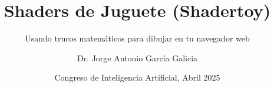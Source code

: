 \documentclass[aspectratio=169,11pt]{beamer}
\title[Shadertoy]{Shaders de Juguete (Shadertoy)}
\subtitle{Usando trucos matemáticos para dibujar en tu navegador web}
\author[Dr. Jorge García]{Dr. Jorge Antonio García Galicia}
\institute[FES Acatlán]{
    \normalsize{\email{nemediano.github.io}}
}
\date[Congreso AI 2025] %
{Congreso de Inteligencia Artificial, Abril 2025}
\begin{document}
\begin{frame}{}
    \maketitle
\end{frame}







\begin{frame}{}
    \maketitle
\end{frame}
\end{document}
